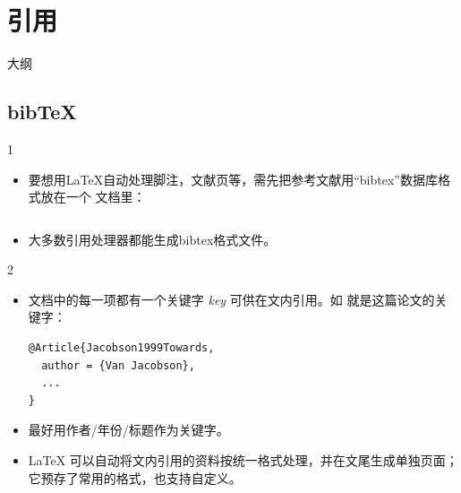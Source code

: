 \documentclass{beamer}
\begin{document}
\section{引用}

\begin{frame}{大纲}
\begin{multicols}{2}
\tableofcontents[currentsection]
\end{multicols}
\end{frame}

\subsection{bib\TeX}
\begin{frame}[fragile]{\insertsubsection{} 1}
\begin{itemize}
\item 要想用\LaTeX{}自动处理脚注，文献页等，需先把参考文献用“bibtex”数据库格式放在一个  文档里：
\inputminted[fontsize=\scriptsize,frame=single]{latex}{ex-p2-bib.bib}
\item 大多数引用处理器都能生成bibtex格式文件。
\end{itemize}
\end{frame}

\begin{frame}[fragile]{\insertsubsection{} 2}
\begin{itemize}
\item {} 文档中的每一项都有一个关键字 \emph{key} 可供在文内引用。如  就是这篇论文的关键字：
\begin{verbatim}
@Article{Jacobson1999Towards,
  author = {Van Jacobson},
  ...
}
\end{verbatim}
\item 最好用作者/年份/标题作为关键字。
\item \LaTeX{} 可以自动将文内引用的资料按统一格式处理，并在文尾生成单独页面；它预存了常用的格式，也支持自定义。
\end{itemize}
\end{frame}
\end{document}
